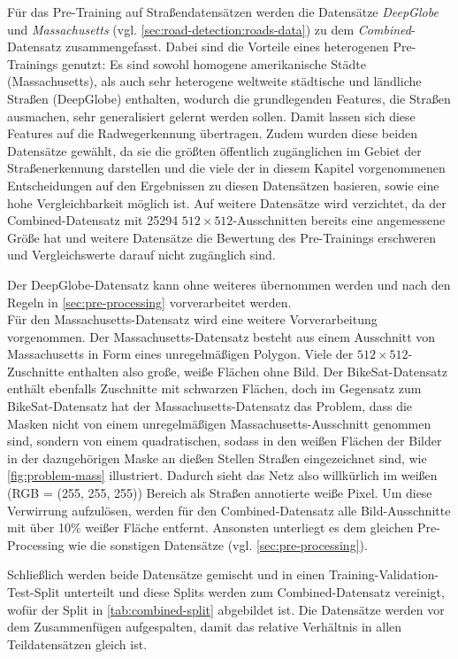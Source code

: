 Für das Pre-Training auf Straßendatensätzen werden die Datensätze \textit{DeepGlobe} und \textit{Massachusetts} 
(vgl. \autoref{sec:road-detection:roads-data}) zu dem \textit{Combined}-Datensatz zusammengefasst. 
Dabei sind die Vorteile eines heterogenen Pre-Trainings genutzt: Es sind sowohl homogene amerikanische Städte (Massachusetts), 
als auch sehr heterogene weltweite städtische und ländliche Straßen (DeepGlobe) enthalten, wodurch 
die grundlegenden Features, die Straßen ausmachen, sehr generalisiert gelernt werden sollen. Damit lassen sich diese 
Features auf die Radwegerkennung übertragen. Zudem wurden diese beiden Datensätze gewählt, da sie die größten öffentlich zugänglichen 
im Gebiet der Straßenerkennung darstellen und die viele der in diesem Kapitel vorgenommenen Entscheidungen 
auf den Ergebnissen zu diesen Datensätzen basieren, sowie eine hohe Vergleichbarkeit möglich ist. 
Auf weitere Datensätze wird verzichtet, da der Combined-Datensatz mit 25294 $512{\times}512$-Ausschnitten 
bereits eine angemessene Größe hat und weitere Datensätze die Bewertung des Pre-Trainings erschweren und Vergleichswerte 
darauf nicht zugänglich sind. 

Der DeepGlobe-Datensatz kann ohne weiteres übernommen werden und nach den Regeln in \autoref{sec:pre-processing} vorverarbeitet werden. \\ 
Für den Massachusetts-Datensatz wird eine weitere Vorverarbeitung vorgenommen. Der Massachusetts-Datensatz 
besteht aus einem Ausschnitt von Massachusetts in Form eines unregelmäßigen Polygon. Viele der $512{\times}512$-Zuschnitte enthalten 
also große, weiße Flächen ohne Bild. Der BikeSat-Datensatz enthält ebenfalls Zuschnitte mit schwarzen Flächen, 
doch im Gegensatz zum BikeSat-Datensatz hat der Massachusetts-Datensatz das Problem, dass die Masken nicht von einem 
unregelmäßigen Massachusetts-Ausschnitt genommen sind, sondern von einem quadratischen, sodass in den weißen Flächen 
der Bilder in der dazugehörigen Maske an dießen Stellen Straßen eingezeichnet sind, wie \autoref{fig:problem-mass} illustriert. 
Dadurch sieht das Netz also willkürlich 
im weißen (RGB = (255, 255, 255)) Bereich als Straßen annotierte weiße Pixel. Um diese Verwirrung aufzulösen, werden 
für den Combined-Datensatz alle Bild-Ausschnitte mit über 10\% weißer Fläche entfernt. 
Ansonsten unterliegt es dem gleichen Pre-Processing wie die sonstigen Datensätze (vgl. \autoref{sec:pre-processing}). 

Schließlich werden beide Datensätze gemischt und in einen Training-Validation-Test-Split unterteilt und diese Splits werden zum 
Combined-Datensatz vereinigt, wofür der Split in \autoref{tab:combined-split} abgebildet ist. 
Die Datensätze werden vor dem Zusammenfügen aufgespalten, damit das relative Verhältnis in allen Teildatensätzen gleich ist.  

